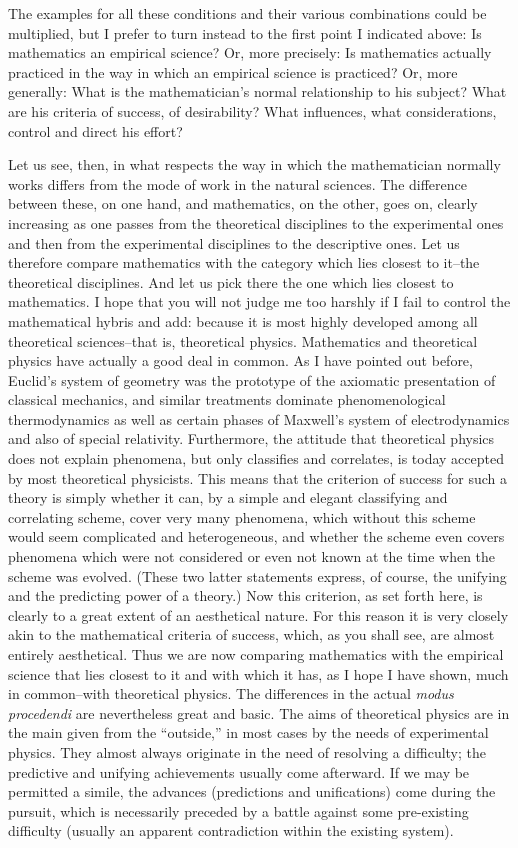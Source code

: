 \documentclass{article}
\begin{document}
The examples for all these conditions and their various combinations could be multiplied, but I prefer to turn instead to the first point I indicated above: Is mathematics an empirical science? Or, more precisely: Is mathematics actually practiced in the way in which an empirical science is practiced? Or, more generally: What is the mathematician's normal relationship to his subject? What are his criteria of success, of desirability? What influences, what considerations, control and direct his effort?

Let us see, then, in what respects the way in which the mathematician normally works differs from the mode of work in the natural sciences. The difference between these, on one hand, and mathematics, on the other, goes on, clearly increasing as one passes from the theoretical disciplines to the experimental ones and then from the experimental disciplines to the descriptive ones. Let us therefore compare mathematics with the category which lies closest to it--the theoretical disciplines. And let us pick there the one which lies closest to mathematics. I hope that you will not judge me too harshly if I fail to control the mathematical hybris and add: because it is most highly developed among all theoretical sciences--that is, theoretical physics. Mathematics and theoretical physics have actually a good deal in common. As I have pointed out before, Euclid's system of geometry was the prototype of the axiomatic presentation of classical mechanics, and similar treatments dominate phenomenological thermodynamics as well as certain phases of Maxwell's system of electrodynamics and also of special relativity. Furthermore, the attitude that theoretical physics does not explain phenomena, but only classifies and correlates, is today accepted by most theoretical physicists. This means that the criterion of success for such a theory is simply whether it can, by a simple and elegant classifying and correlating scheme, cover very many phenomena, which without this scheme would seem complicated and heterogeneous, and whether the scheme even covers phenomena which were not considered or even not known at the time when the scheme was evolved. (These two latter statements express, of course, the unifying and the predicting power of a theory.) Now this criterion, as set forth here, is clearly to a great extent of an aesthetical nature. For this reason it is very closely akin to the mathematical criteria of success, which, as you shall see, are almost entirely aesthetical. Thus we are now comparing mathematics with the empirical science that lies closest to it and with which it has, as I hope I have shown, much in common--with theoretical physics. The differences in the actual \textit{modus procedendi} are nevertheless great and basic. The aims of theoretical physics are in the main given from the ``outside,'' in most cases by the needs of experimental physics. They almost always originate in the need of resolving a difficulty; the predictive and unifying achievements usually come afterward. If we may be permitted a simile, the advances (predictions and unifications) come during the pursuit, which is necessarily preceded by a battle against some pre-existing difficulty (usually an apparent contradiction within the existing system). 
\end{document}
